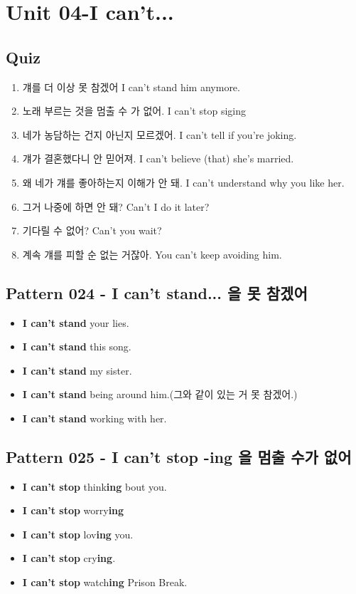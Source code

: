 \documentclass[11pt]{oblivoir}
\begin{document}
\section{Unit 04-I can't...}
\subsection{Quiz}
\begin{enumerate}
  \color{black} \item 걔를 더 이상 못 참겠어
    \color{light-gray} I can't stand him anymore.
  \color{black} \item 노래 부르는 것을 멈출 수 가 없어.
    \color{light-gray} I can't stop siging
  \color{black} \item 네가 농담하는 건지 아닌지 모르겠어.
    \color{light-gray} I can't tell if you're joking.
  \color{black} \item 걔가 결혼했다니 안 믿어져.
    \color{light-gray} I can't believe (that) she's married.
  \color{black} \item 왜 네가 걔를 좋아하는지 이해가 안 돼.
    \color{light-gray} I can't understand why you like her.
  \color{black} \item 그거 나중에 하면 안 돼?
    \color{light-gray} Can't I do it later?
  \color{black} \item 기다릴 수 없어?
    \color{light-gray} Can't you wait?
  \color{black} \item 계속 걔를 피할 순 없는 거잖아.
    \color{light-gray} You can't keep avoiding him.
\end{enumerate}

\subsection{Pattern 024 - I can't stand... \texttildelow 을 못 참겠어}
\begin{itemize}
  \item \textbf{I can't stand} your lies.
  \item \textbf{I can't stand} this song.
  \item \textbf{I can't stand} my sister.
  \item \textbf{I can't stand} being around him.(그와 같이 있는 거 못 참겠어.)
  \item \textbf{I can't stand} working with her.
\end{itemize}

\subsection{Pattern 025 - I can't stop -ing \texttildelow 을 멈출 수가 없어}
\begin{itemize}
  \item \textbf{I can't stop} think\textbf{ing} bout you.
  \item \textbf{I can't stop} worry\textbf{ing}
  \item \textbf{I can't stop} lov\textbf{ing} you.
  \item \textbf{I can't stop} cry\textbf{ing}.
  \item \textbf{I can't stop} watch\textbf{ing} Prison Break.
\end{itemize}
\end{document}
